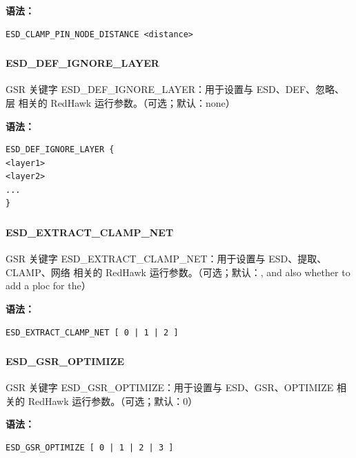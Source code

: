 \textbf{语法：}
\begin{lstlisting}
ESD_CLAMP_PIN_NODE_DISTANCE <distance>
\end{lstlisting}

\subsubsection{}
\paragraph*{ESD_DEF_IGNORE_LAYER}

GSR 关键字 ESD_DEF_IGNORE_LAYER：用于设置与 ESD、DEF、忽略、层 相关的 RedHawk 运行参数。（可选；默认：none）

\textbf{语法：}
\begin{lstlisting}
ESD_DEF_IGNORE_LAYER {
<layer1>
<layer2>
...
}
\end{lstlisting}

\subsubsection{}
\paragraph*{ESD_EXTRACT_CLAMP_NET}

GSR 关键字 ESD_EXTRACT_CLAMP_NET：用于设置与 ESD、提取、CLAMP、网络 相关的 RedHawk 运行参数。（可选；默认：, and also whether to add a ploc for the）

\textbf{语法：}
\begin{lstlisting}
ESD_EXTRACT_CLAMP_NET [ 0 | 1 | 2 ]
\end{lstlisting}

\subsubsection{}
\paragraph*{ESD_GSR_OPTIMIZE}

GSR 关键字 ESD_GSR_OPTIMIZE：用于设置与 ESD、GSR、OPTIMIZE 相关的 RedHawk 运行参数。（可选；默认：0）

\textbf{语法：}
\begin{lstlisting}
ESD_GSR_OPTIMIZE [ 0 | 1 | 2 | 3 ]
\end{lstlisting}

